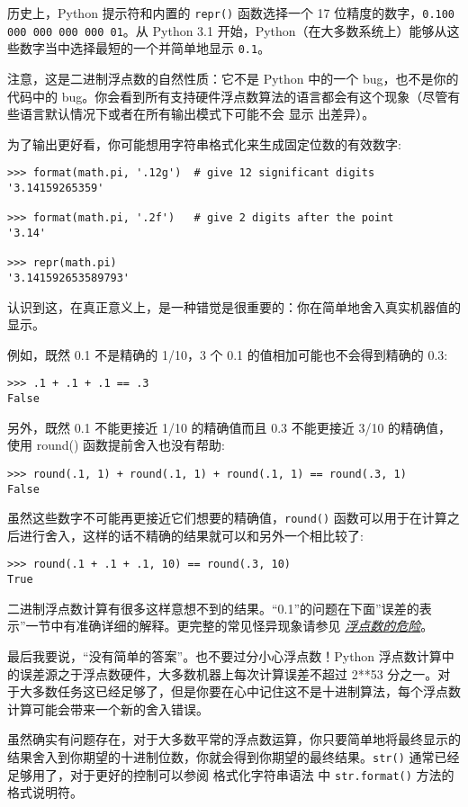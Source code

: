 历史上，Python 提示符和内置的 \texttt{repr()} 函数选择一个 17 位精度的数字，\texttt{0.100 000 000 000 000 01}。从 Python 3.1 开始，Python（在大多数系统上）能够从这些数字当中选择最短的一个并简单地显示 \texttt{0.1}。

注意，这是二进制浮点数的自然性质：它不是 Python 中的一个 bug，也不是你的代码中的 bug。你会看到所有支持硬件浮点数算法的语言都会有这个现象（尽管有些语言默认情况下或者在所有输出模式下可能不会 显示 出差异）。

为了输出更好看，你可能想用字符串格式化来生成固定位数的有效数字:
\begin{lstlisting}
>>> format(math.pi, '.12g')  # give 12 significant digits
'3.14159265359'

>>> format(math.pi, '.2f')   # give 2 digits after the point
'3.14'

>>> repr(math.pi)
'3.141592653589793'
\end{lstlisting}
认识到这，在真正意义上，是一种错觉是很重要的：你在简单地舍入真实机器值的显示。

例如，既然 0.1 不是精确的 1/10，3 个 0.1 的值相加可能也不会得到精确的 0.3:
\begin{lstlisting}
>>> .1 + .1 + .1 == .3
False
\end{lstlisting}
另外，既然 0.1 不能更接近 1/10 的精确值而且 0.3 不能更接近 3/10 的精确值，使用 round() 函数提前舍入也没有帮助:
\begin{lstlisting}
>>> round(.1, 1) + round(.1, 1) + round(.1, 1) == round(.3, 1)
False
\end{lstlisting}
虽然这些数字不可能再更接近它们想要的精确值，\texttt{round()} 函数可以用于在计算之后进行舍入，这样的话不精确的结果就可以和另外一个相比较了:
\begin{lstlisting}
>>> round(.1 + .1 + .1, 10) == round(.3, 10)
True
\end{lstlisting}
二进制浮点数计算有很多这样意想不到的结果。“0.1”的问题在下面”误差的表示”一节中有准确详细的解释。更完整的常见怪异现象请参见 \href{http://www.lahey.com/float.htm}{\textit{浮点数的危险}}。

最后我要说，“没有简单的答案”。也不要过分小心浮点数！Python 浮点数计算中的误差源之于浮点数硬件，大多数机器上每次计算误差不超过 2**53 分之一。对于大多数任务这已经足够了，但是你要在心中记住这不是十进制算法，每个浮点数计算可能会带来一个新的舍入错误。

虽然确实有问题存在，对于大多数平常的浮点数运算，你只要简单地将最终显示的结果舍入到你期望的十进制位数，你就会得到你期望的最终结果。\texttt{str()} 通常已经足够用了，对于更好的控制可以参阅 格式化字符串语法 中 \texttt{str.format()} 方法的格式说明符。

